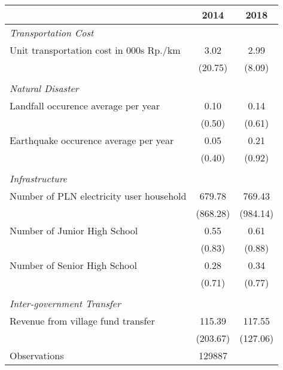 \begin{tabular}{l*{2}{c}}
\hline\hline
                    &        2014&        2018\\
\hline
\emph{Transportation Cost}&            &            \\
\hspace{0.25cm} Unit transportation cost in 000s Rp./km&        3.02&        2.99\\
                    &     (20.75)&      (8.09)\\
\vspace{0.05em} \\ \emph{Natural Disaster}&            &            \\
\hspace{0.25cm} Landfall occurence average per year&        0.10&        0.14\\
                    &      (0.50)&      (0.61)\\
\hspace{0.25cm} Earthquake occurence average per year&        0.05&        0.21\\
                    &      (0.40)&      (0.92)\\
\vspace{0.05em} \\ \emph{Infrastructure}&            &            \\
\hspace{0.25cm} Number of PLN electricity user household&      679.78&      769.43\\
                    &    (868.28)&    (984.14)\\
\hspace{0.25cm} Number of Junior High School&        0.55&        0.61\\
                    &      (0.83)&      (0.88)\\
\hspace{0.25cm} Number of Senior High School&        0.28&        0.34\\
                    &      (0.71)&      (0.77)\\
\vspace{0.05em} \\ \emph{Inter-government Transfer}&            &            \\
\hspace{0.25cm} Revenue from village fund transfer&      115.39&      117.55\\
                    &    (203.67)&    (127.06)\\
\hline
Observations        &      129887&            \\
\hline\hline
\end{tabular}
